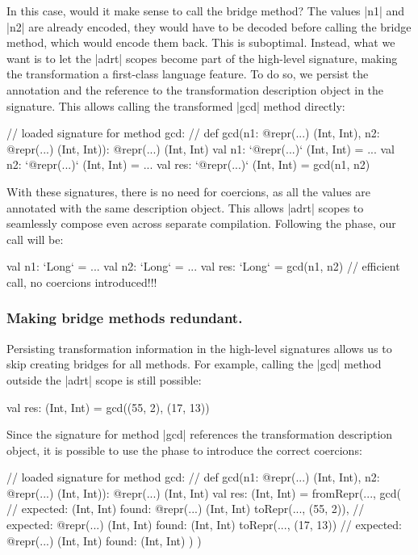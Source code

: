 In this case, would it make sense to call the bridge method? The values |n1| and |n2| are already encoded, they would have to be decoded before calling the bridge method, which would encode them back. This is suboptimal. Instead, what we want is to let the |adrt| scopes become part of the high-level signature, making the transformation a first-class language feature. To do so, we persist the annotation and the reference to the transformation description object in the signature. This allows calling the transformed |gcd| method directly:

\begin{lstlisting-nobreak}
// loaded signature for method gcd:
//  def gcd(n1: @repr(...) (Int, Int), n2: @repr(...) (Int, Int)): @repr(...) (Int, Int)
val n1: `@repr(...)` (Int, Int) = ...
val n2: `@repr(...)` (Int, Int) = ...
val res: `@repr(...)` (Int, Int) = gcd(n1, n2)
\end{lstlisting-nobreak}

With these signatures, there is no need for coercions, as all the values are annotated with the same description object. This allows |adrt| scopes to seamlessly compose even across separate compilation. Following the \commit{} phase, our call will be:

\begin{lstlisting-nobreak}
val n1: `Long` = ...
val n2: `Long` = ...
val res: `Long` = gcd(n1, n2) // efficient call, no coercions introduced!!!
\end{lstlisting-nobreak}

\subsubsection{Making bridge methods redundant.} Persisting transformation information in the high-level signatures allows us to skip creating bridges for all methods. For example, calling the |gcd| method outside the |adrt| scope is still possible:

\begin{lstlisting-nobreak}
val res: (Int, Int) = gcd((55, 2), (17, 13))
\end{lstlisting-nobreak}

Since the signature for method |gcd| references the transformation description object, it is possible to use the \coerce{} phase to introduce the correct coercions:

\begin{lstlisting-nobreak}
// loaded signature for method gcd:
//  def gcd(n1: @repr(...) (Int, Int), n2: @repr(...) (Int, Int)): @repr(...) (Int, Int)
val res: (Int, Int) =
  fromRepr(...,
    gcd(                           // expected: (Int, Int) found: @repr(...) (Int, Int)
      toRepr(..., (55, 2)),   // expected: @repr(...) (Int, Int) found: (Int, Int)
      toRepr(..., (17, 13))  // expected: @repr(...) (Int, Int) found: (Int, Int)
    )
  )
\end{lstlisting-nobreak}

